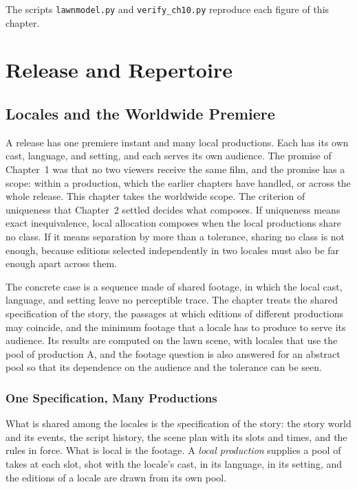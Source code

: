 \documentclass[11pt,twoside,openright]{book}
\theoremstyle{plain}
\theoremstyle{definition}
\theoremstyle{remark}
\begin{document}
The scripts \texttt{lawnmodel.py} and \texttt{verify\_ch10.py} reproduce each figure of this chapter.

\part{Release and Repertoire}

\chapter{Locales and the Worldwide Premiere}
\label{ch:locales}

A release has one premiere instant and many local productions. Each has its own cast, language, and setting, and each serves its own audience. The promise of Chapter~1 was that no two viewers receive the same film, and the promise has a scope: within a production, which the earlier chapters have handled, or across the whole release. This chapter takes the worldwide scope. The criterion of uniqueness that Chapter~2 settled decides what composes. If uniqueness means exact inequivalence, local allocation composes when the local productions share no class. If it means separation by more than a tolerance, sharing no class is not enough, because editions selected independently in two locales must also be far enough apart across them.

The concrete case is a sequence made of shared footage, in which the local cast, language, and setting leave no perceptible trace. The chapter treats the shared specification of the story, the passages at which editions of different productions may coincide, and the minimum footage that a locale has to produce to serve its audience. Its results are computed on the lawn scene, with locales that use the pool of production A, and the footage question is also answered for an abstract pool so that its dependence on the audience and the tolerance can be seen.

\section{One Specification, Many Productions}\label{sec:spec}

What is shared among the locales is the specification of the story: the story world and its events, the script history, the scene plan with its slots and times, and the rules in force. What is local is the footage. A \emph{local production} supplies a pool of takes at each slot, shot with the locale's cast, in its language, in its setting, and the editions of a locale are drawn from its own pool.
\end{document}
